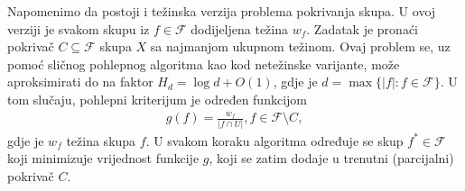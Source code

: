 \documentclass[b5paper, utf8, 11pt, colorlinks]{book}
\theoremstyle{definition}
\begin{document}
Napomenimo da postoji i težinska verzija problema pokrivanja skupa. U ovoj verziji je svakom skupu iz $f \in\mathcal{F}$ dodijeljena težina $w_f$. Zadatak je pronaći pokrivač $C \subseteq \mathcal{F}$ skupa $X$ sa najmanjom ukupnom težinom. Ovaj problem se,  uz pomoć sličnog pohlepnog algoritma kao kod netežinske varijante, može aproksimirati do na faktor $H_d= \log d+O(1)$, gdje je $d= \max\{|f|:f \in \mathcal{F}\}$. U tom slučaju, pohlepni kriterijum je određen funkcijom 
\begin{align}
	g(f) = \frac{w_f}{|f \cap U|}, f \in \mathcal{F}\setminus C,
\end{align}
gdje je $w_f$ težina skupa $f$. U svakom koraku algoritma određuje se skup $f^* \in \mathcal{F}$ koji minimizuje vrijednost funkcije $g$, koji se zatim dodaje u trenutni (parcijalni) pokrivač $C$.
\end{document}
